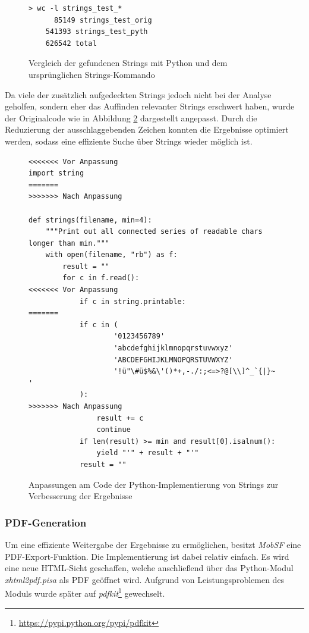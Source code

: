 \begin{figure}[htbp]
\begin{lstlisting}
> wc -l strings_test_*
	  85149 strings_test_orig
  	541393 strings_test_pyth
    626542 total
\end{lstlisting}
\caption{Vergleich der gefundenen Strings mit Python und dem ursprünglichen Strings-Kommando}
\label{lst:WeitMobSFVerglSrings}
\end{figure}

Da viele der zusätzlich aufgedeckten Strings jedoch nicht bei der Analyse geholfen, sondern eher das Auffinden relevanter Strings erschwert haben, wurde der Originalcode wie in Abbildung \ref{lst:WeitMobSFStringsAnpassungen} dargestellt angepasst. Durch die Reduzierung der ausschlaggebenden Zeichen konnten die Ergebnisse optimiert werden, sodass eine effiziente Suche über Strings wieder möglich ist.

\begin{figure}[htbp]
\begin{lstlisting}[escapechar=\ü]
<<<<<<< Vor Anpassung
import string
=======
>>>>>>> Nach Anpassung

def strings(filename, min=4):
    """Print out all connected series of readable chars longer than min."""
    with open(filename, "rb") as f:
        result = ""
        for c in f.read():
<<<<<<< Vor Anpassung
            if c in string.printable:
=======
            if c in (
                    '0123456789'
                    'abcdefghijklmnopqrstuvwxyz'
                    'ABCDEFGHIJKLMNOPQRSTUVWXYZ'
                    '!ü"\#ü$%&\'()*+,-./:;<=>?@[\\]^_`{|}~ '
            ):
>>>>>>> Nach Anpassung
                result += c
                continue
            if len(result) >= min and result[0].isalnum():
                yield "'" + result + "'"
            result = ""
\end{lstlisting}
\caption{Anpassungen am Code der Python-Implementierung von Strings zur Verbesserung der Ergebnisse}
\label{lst:WeitMobSFStringsAnpassungen}
\end{figure}

\subsubsection{PDF-Generation}
Um eine effiziente Weitergabe der Ergebnisse zu ermöglichen, besitzt \textit{MobSF} eine PDF-Export-Funktion. Die Implementierung ist dabei relativ einfach. Es wird eine neue HTML-Sicht geschaffen, welche anschließend über das Python-Modul \textit{xhtml2pdf.pisa} als PDF geöffnet wird. Aufgrund von Leistungsproblemen des Moduls wurde später auf \textit{pdfkit}\footnote{\url{https://pypi.python.org/pypi/pdfkit}} gewechselt.\\

